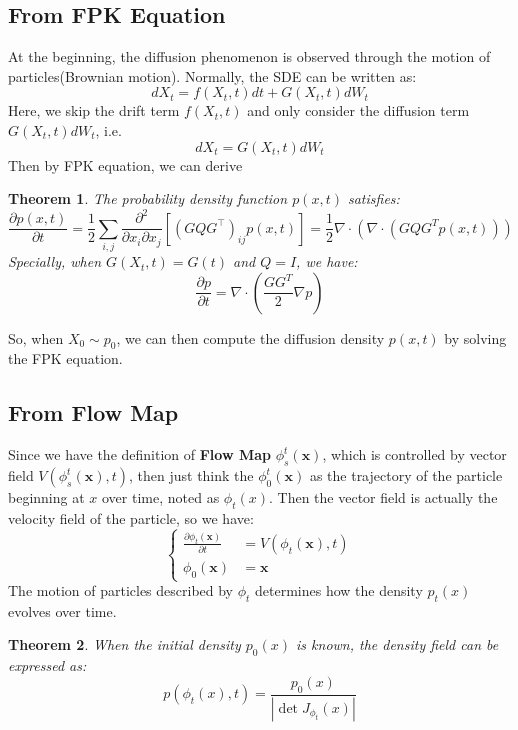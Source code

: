 \documentclass{article}
\newtheorem{theorem}{Theorem}
\begin{document}
\subsection{From FPK Equation}
At the beginning, the diffusion phenomenon is observed through the motion of particles(Brownian motion). 
Normally, the SDE can be written as:
\begin{equation}
    dX_t = f(X_t, t)dt + G(X_t, t)dW_t
\end{equation}
Here, we skip the drift term $f(X_t, t)$ and only consider the diffusion term $G(X_t, t)dW_t$, i.e.
\begin{equation}
    dX_t = G(X_t, t)dW_t
\end{equation}
Then by FPK equation, we can derive 
\begin{theorem}
    The probability density function $p(x, t)$ satisfies:
\begin{equation}
    \frac{\partial p(x, t)}{\partial t} = \frac{1}{2} \sum_{i, j} \frac{\partial^{2}}{\partial x_{i} \partial x_{j}}\left[\left(G Q G^{\top}\right)_{i j} p(x, t)\right]=\frac{1}{2}\nabla \cdot \left(\nabla\cdot (GQG^Tp(x, t))\right)
\end{equation}
Specially, when $G(X_t, t)=G(t)$ and $Q=I$, we have:
\begin{equation}
    \frac{\partial p}{\partial t} = \nabla \cdot \left(\frac{GG^T}{2}\nabla p\right)
\end{equation}
\end{theorem}
So, when $X_0\sim p_0$, we can then compute the diffusion density $p(x, t)$ by solving the FPK equation.
\subsection{From Flow Map}
Since we have the definition of \textbf{Flow Map} $\phi_s^t(\mathbf{x})$, which is controlled by vector field $V(\phi_s^t(\mathbf{x}), t)$, 
then just think the $\phi_0^t(\mathbf{x})$ as the trajectory of the particle beginning at $x$ over time, noted as $\phi_t(x)$.
Then the vector field is actually the velocity field of the particle, so we have:
\begin{equation}\left\{
    \begin{aligned}
        \frac{\partial \phi_t(\mathbf{x})}{\partial t} &= V(\phi_t(\mathbf{x}), t)\\
        \phi_0(\mathbf{x}) &= \mathbf{x}
    \end{aligned}\right.
\end{equation}
The motion of particles described by $\phi_t$ determines how the density $p_t(x)$ evolves over time. 
\begin{theorem}
    When the initial density $p_0(x)$ is known, the density field can be expressed as:
\begin{equation}
    p(\phi_t(x), t) = \frac{p_0(x)}{\left|\det J_{\phi_t}(x)\right|}
\end{equation}
\end{theorem}
\end{document}
